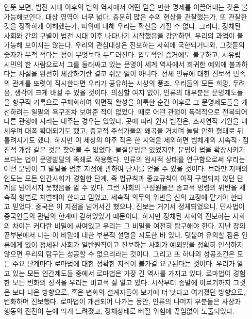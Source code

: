 언뜻 보면, 법전 시대 이후의 법의 역사에서 어떤 믿을 만한 명제를
이끌어내는 것은 불가능해보인다.
대상 영역이 너무 넓다.
충분히 많은 수의 현상을 관찰했는가,
또 관찰한 것을 정확하게 이해했는가, 따위에 대해 우리는 확신을 가질 수 없다.
그러나,
정체된 사회와
 간의 구별이
법전 시대 이후
나타나기 시작했음을
감안하면, 우리의 과업이 불가능해 보이지는 않는다.
우리의 관심대상은 진보하는 사회에 국한되거니와,
그것들의 숫자가 무척 적다는 점이 무엇보다 두드러진다.
압도적인 증거에도 불구하고, 서유럽 시민의 한 사람으로서
그를 둘러싸고 있는 문명이 세계 역사에서 희귀한 예외에 불과하다는 사실을
완전히 체감하기란 결코 쉬운 일이 아니다.
전체 인류에 대한 진보적 민족의 관계를 또렷이 직시한다면
우리가 공유하는 사상의 풍조, 우리들의 모든 희망, 두려움, 생각이
크게 바뀔 수 있을 것이다.
의심할 여지 없이, 인류의 대부분은
문명제도들을 항구적 기록으로 구체화하여 외면적 완성을 이룩한 순간 이후로
그 문명제도들을 개선하려는 일말의 욕구조차
보여준 적이 없었다.
때로 어떤 관행이 폭력적으로 전복되어 다른 관행에 자리는 내주는 경우는 있었다.
곳에 따라 원시 법전은,
초자연적 기원을 내세우며 대폭 확대되기도 했고,
종교적 주석가들의 왜곡을 거치며 놀랄 만한 형태로 뒤틀려지기도 했다.
하지만 이 세상의 아주 작은 한 지역을 제외하면
법체계의 지속적^^b7점진적 개량 같은 것은 찾아볼 수 없었다.
물질문명은 있었지만, 문명이 법을 확장시키기보다는
법이 문명발달의 족쇄로 작용했다.
인류의 원시적 상태를 연구함으로써 우리는
어떤 문명이 그 발달을 멈춘 지점에 관하여 단서를 얻을 수 있을 것이다.
브라만 지배의 인도는 모든 인간사회가 경험한 단계, 즉
법규칙과 종교규칙이 아직 구별되지 않던 단계를 넘어서지 못했음을 알 수 있다.
그런 사회의 구성원들은 종교적 명령의 위반을 세속적 형벌로 처벌해야 한다고
믿었고, 세속적 의무의 위반을 신의 교정에 맡겨야 한다고 믿었다.
중국은 이 지점을 넘어서긴 했으나,
진보는 거기서 정체되었으니,
민사법이 중국인들의 관념의 한계에 갇혀있었기 때문이다.
하지만 정체된 사회와 진보하는 사회의 차이는
커다란 비밀에 싸여있고 우리는 그 비밀을 여전히 탐구해야 한다.
지난 장의 끝부분에서 나는 이 비밀에 대한 부분적 설명을 시도한 바 있다.
덧붙여 유의할 점은 인류에게 있어 정체된 사회가 일반원칙이고
진보하는 사회가 예외임을 정확히 인식하지 않으면 우리의 탐구는
성공할 수 없으리라는 것이다.
그리고 또 하나의 성공조건은 모든 주요 단계마다 로마법에 대한 정확한 지식이
불가결 요구된다는 것이다.
우리가 알고 있는 모든 인간제도들 중에서 로마법은 가장 긴 역사를 가지고 있다.
로마법이 경험한 모든 변화의 성격을 우리는 비교적 잘 알고 있다.
시작부터 종말에 이르기까지 그것은 보다 나은 방향으로,
혹은 변화의 설계자들이 보기에 더 낫다고 여겨졌던 방향으로,
변화하며 진보했다.
로마법이 개선되어 나가는 동안,
인류의 나머지 부분들은 사상과 행동의 진전이 눈에 띄게 느려졌고,
정체상태로 빠질 위험에 끊임없이 노출되었다.

